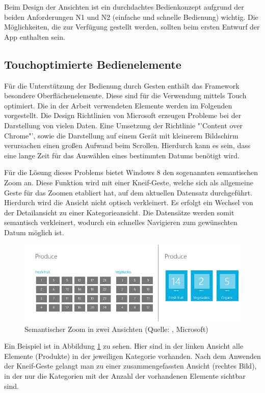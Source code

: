 Beim Design der Ansichten ist ein durchdachtes Bedienkonzept aufgrund der beiden Anforderungen N1 und N2 (einfache und schnelle Bedienung) wichtig. Die Möglichkeiten, die zur Verfügung gestellt werden, sollten beim ersten Entwurf der App enthalten sein.

\subsection{Touchoptimierte Bedienelemente}
Für die Unterstützung der Bedienung durch Gesten enthält das Framework besondere Oberflächenelemente. Diese sind für die Verwendung mittels Touch optimiert. Die in der Arbeit verwendeten Elemente werden im Folgenden vorgestellt.
Die Design Richtlinien von Microsoft erzeugen Probleme bei der Darstellung von vielen Daten. Eine Umsetzung der Richtlinie "'Content over Chrome"', sowie die Darstellung auf einem Gerät mit kleinerem Bildschirm verursachen einen großen Aufwand beim Scrollen. Hierdurch kann es sein, dass eine lange Zeit für das Auswählen eines bestimmten Datums benötigt wird. \par


Für die Lösung dieses Problems bietet Windows 8 den sogenannten semantischen Zoom an. Diese Funktion wird mit einer Kneif-Geste, welche sich als allgemeine Geste für das Zoomen etabliert hat, auf dem aktuellen Datensatz durchgeführt. Hierdurch wird die Ansicht nicht optisch verkleinert. Es erfolgt ein Wechsel von der Detailansicht zu einer Kategorieansicht. Die Datensätze werden somit semantisch verkleinert, wodurch ein schnelles Navigieren zum gewünschten Datum möglich ist. \par 
\begin{figure}
\centering
\includegraphics[width=\hsize]{images/semanticZoomOut}
\caption{Semantischer Zoom in zwei Ansichten (Quelle: \cite{bib:semanticZoom}, Microsoft)}
\label{semanticZoomIllustration}
\end{figure}
Ein Beispiel ist in Abbildung \ref{semanticZoomIllustration} zu sehen. Hier sind in der linken Ansicht alle Elemente (Produkte) in der jeweiligen Kategorie vorhanden. Nach dem Anwenden der Kneif-Geste gelangt man zu einer zusammengefassten Ansicht (rechtes Bild), in der nur die Kategorien mit der Anzahl der vorhandenen Elemente sichtbar sind. \par 

